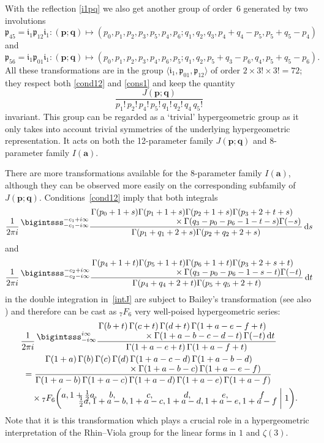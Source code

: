 \documentclass[12pt,reqno]{amsart}
\theoremstyle{remark}
\renewcommand{\d}{{\mathrm d}}
\newcommand\ba{\boldsymbol a}
\newcommand\bp{\boldsymbol p}
\newcommand\bq{\boldsymbol q}
\newcommand\fri{\mathfrak i}
\newcommand\frp{\mathfrak p}
\begin{document}
With the reflection \eqref{i1pq} we also get another group of order~6 generated by two involutions
\[
\frp_{45}=\fri_1\frp_{12}\fri_1\colon(\bp;\bq)
\mapsto(p_0,p_1,p_2,p_3,p_5,p_4,p_6;q_1,q_2,q_3,p_4+q_4-p_5,p_5+q_5-p_4)
\]
and
\[
\frp_{56}=\fri_1\frp_{01}\fri_1\colon(\bp;\bq)
\mapsto(p_0,p_1,p_2,p_3,p_4,p_6,p_5;q_1,q_2,p_5+q_3-p_6,q_4,p_5+q_5-p_6).
\]
All these transformations are in the group $\langle\fri_1,\frp_{01},\frp_{12}\rangle$ of order $2\times3!\times3!=72$; they respect both \eqref{cond12} and \eqref{cons1} and keep the quantity
\[
\frac{J(\bp;\bq)}{p_1!\,p_2!\,p_4!\,p_5!\,q_1!\,q_2!\,q_4\,q_5!}
\]
invariant. This group can be regarded as a `trivial' hypergeometric group as it only takes into account trivial symmetries of the underlying hypergeometric representation. It acts on both the 12-parameter family $J(\bp;\bq)$ and 8-parameter family $I(\ba)$.

There are more transformations available for the 8-parameter family $I(\ba)$, although they can be observed more easily on the corresponding subfamily of $J(\bp;\bq)$.
Conditions~\eqref{cond12} imply that both integrals
\begin{equation*}
\frac1{2\pi i}\,\raisebox{1.8mm}{$\displaystyle\bigintsss_{-c_1-i\infty}^{-c_1+i\infty}$}
\frac{\splitfrac{\Gamma(p_0+1+s)\Gamma(p_1+1+s)\Gamma(p_2+1+s)\Gamma(p_3+2+t+s)}{\times\Gamma(q_3-p_0-p_6-1-t-s)\Gamma(-s)}}
{\Gamma(p_1+q_1+2+s)\Gamma(p_2+q_2+2+s)}\,\d s
\end{equation*}
and
\[
\frac1{2\pi i}\,\raisebox{1.8mm}{$\displaystyle\bigintsss_{-c_2-i\infty}^{-c_2+i\infty}$}
\frac{\splitfrac{\Gamma(p_4+1+t)\Gamma(p_5+1+t)\Gamma(p_6+1+t)\Gamma(p_3+2+s+t)}{\times\Gamma(q_3-p_0-p_6-1-s-t)\Gamma(-t)}}
{\Gamma(p_4+q_4+2+t)\Gamma(p_5+q_5+2+t)}\,\d t
\]
in the double integration in~\eqref{intJ} are subject to Bailey's transformation \cite[\S\,6.3, eq.~(2)]{Ba35} (see also \cite[eq.~(4.7.1.3)]{Sl66}) and therefore can be cast as $_7F_6$ very well-poised hypergeometric series:
\begin{align}
&
\frac1{2\pi i}\,\raisebox{1.8mm}{$\displaystyle\bigintsss_{-i\infty}^{i\infty}$}
\frac{\splitfrac{\Gamma(b+t)\,\Gamma(c+t)\,\Gamma(d+t)\,\Gamma(1+a-e-f+t)}{\times\Gamma(1+a-b-c-d-t)\,\Gamma(-t)\,\d t}}
{\Gamma(1+a-e+t)\,\Gamma(1+a-f+t)}
\nonumber\\ &\;
=\frac{\splitfrac{\Gamma(1+a)\,\Gamma(b)\,\Gamma(c)\,\Gamma(d)\,\Gamma(1+a-c-d)\,\Gamma(1+a-b-d)}{\times\Gamma(1+a-b-c)\,\Gamma(1+a-e-f)}}
{\Gamma(1+a-b)\,\Gamma(1+a-c)\,\Gamma(1+a-d)\,\Gamma(1+a-e)\,\Gamma(1+a-f)}
\nonumber\\ &\;\quad\times
{}_7F_6\biggl(\begin{alignedat}{7} & a, &\,& 1+\tfrac12a, &\,& \quad\; b, &\,& \qquad c, &\,& \qquad d, &\,& \qquad e, &\,& \qquad f \\[-3\jot]
 & &\,& \quad \tfrac12a, &\,& {\kern-2.5mm}1+a-b, &\,& 1+a-c, &\,& 1+a-d, &\,& 1+a-e, &\,& 1+a-f \end{alignedat} \biggm| 1 \biggr).
\label{7F6tr}
\end{align}
Note that it is this transformation which plays a crucial role in a hypergeometric interpretation \cite{Zu04} of the Rhin--Viola group \cite{RV01} for the linear forms in $1$ and $\zeta(3)$.
\end{document}
